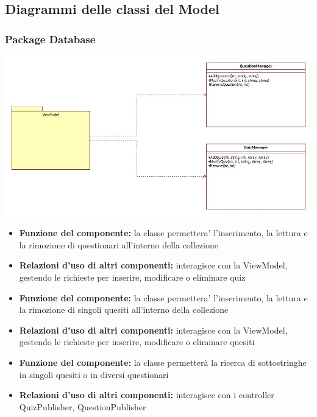 \subsection{Diagrammi delle classi del Model}
			\subsubsection{Package Database}
			\begin{center}
				\includegraphics[scale=0.5]{../images/Database.jpg}
			\end{center}
			\begin{itemize}
		    	\item\textbf{Funzione del componente:} la classe permettera' l'inserimento, la lettura e la rimozione di questionari all'interno della collezione
			\item\textbf{Relazioni d'uso di altri componenti:} interagisce con la ViewModel, gestendo le richieste per inserire, modificare o eliminare quiz
			\end{itemize}
			\begin{itemize}
		    	\item\textbf{Funzione del componente:} la classe permettera' l'inserimento, la lettura e la rimozione di singoli quesiti all'interno della collezione
			\item\textbf{Relazioni d'uso di altri componenti:} interagisce con la ViewModel, gestendo le richieste per inserire, modificare o eliminare quesiti
			\end{itemize}
			\begin{itemize}
		    	\item\textbf{Funzione del componente:} la classe permetterà la ricerca di sottostringhe in singoli quesiti o in diversi questionari
			\item\textbf{Relazioni d'uso di altri componenti:} interagisce con i controller QuizPublisher, QuestionPublisher
			\end{itemize}
			
